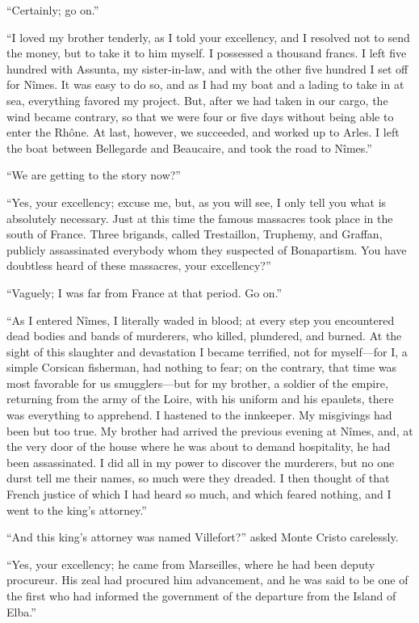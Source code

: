 “Certainly; go on.”

“I loved my brother tenderly, as I told your excellency, and I resolved
not to send the money, but to take it to him myself. I possessed a
thousand francs. I left five hundred with Assunta, my sister-in-law,
and with the other five hundred I set off for Nîmes. It was easy to do
so, and as I had my boat and a lading to take in at sea, everything
favored my project. But, after we had taken in our cargo, the wind
became contrary, so that we were four or five days without being able
to enter the Rhône. At last, however, we succeeded, and worked up to
Arles. I left the boat between Bellegarde and Beaucaire, and took the
road to Nîmes.”

“We are getting to the story now?”

“Yes, your excellency; excuse me, but, as you will see, I only tell you
what is absolutely necessary. Just at this time the famous massacres
took place in the south of France. Three brigands, called Trestaillon,
Truphemy, and Graffan, publicly assassinated everybody whom they
suspected of Bonapartism. You have doubtless heard of these massacres,
your excellency?”

“Vaguely; I was far from France at that period. Go on.”

“As I entered Nîmes, I literally waded in blood; at every step you
encountered dead bodies and bands of murderers, who killed, plundered,
and burned. At the sight of this slaughter and devastation I became
terrified, not for myself—for I, a simple Corsican fisherman, had
nothing to fear; on the contrary, that time was most favorable for us
smugglers—but for my brother, a soldier of the empire, returning from
the army of the Loire, with his uniform and his epaulets, there was
everything to apprehend. I hastened to the innkeeper. My misgivings had
been but too true. My brother had arrived the previous evening at
Nîmes, and, at the very door of the house where he was about to demand
hospitality, he had been assassinated. I did all in my power to
discover the murderers, but no one durst tell me their names, so much
were they dreaded. I then thought of that French justice of which I had
heard so much, and which feared nothing, and I went to the king’s
attorney.”

“And this king’s attorney was named Villefort?” asked Monte Cristo
carelessly.

“Yes, your excellency; he came from Marseilles, where he had been
deputy procureur. His zeal had procured him advancement, and he was
said to be one of the first who had informed the government of the
departure from the Island of Elba.”


